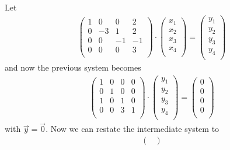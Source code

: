 \documentclass{article}
\begin{document}
\begin{enumerate}
    Let
    \begin{align*}
        \begin{pmatrix}
            1 & 0 & 0 & 2 \\
            0 & -3 & 1 & 2 \\
            0 & 0 & -1 & -1 \\
            0 & 0 & 0 & 3 \\
        \end{pmatrix} \cdot \begin{pmatrix}
            x_1 \\ x_2 \\ x_3 \\ x_4 \\
        \end{pmatrix}
        =
        \begin{pmatrix}
            y_1 \\ y_2 \\ y_3 \\ y_4 \\
        \end{pmatrix}
    \end{align*}
    and now the previous system becomes
    \begin{align*}
        \begin{pmatrix}
            1 & 0 & 0 & 0 \\
            0 & 1 & 0 & 0 \\
            1 & 0 & 1 & 0 \\
            0 & 0 & 3 & 1 \\
        \end{pmatrix} \cdot 
        \begin{pmatrix}
            y_1 \\ y_2 \\ y_3 \\ y_4 \\
        \end{pmatrix} =
        \begin{pmatrix}
            0 \\ 0 \\ 0 \\ 0 \\ 
        \end{pmatrix}
    \end{align*}
    with $\vec{y} = \vec{0}$. Now we can restate the intermediate system to
    \begin{align*}
        \begin{pmatrix}

\end{pmatrix}
\end{align*}
\end{enumerate}
\end{document}
